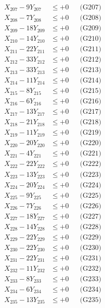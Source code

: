 \documentclass[a4paper,10pt]{article}
\begin{document}
{\begin{align}
X_{207} - 9Y_{207} &\leq +0 && \text{(G207)} \\
\allowbreak
X_{208} - 7Y_{208} &\leq +0 && \text{(G208)} \\
X_{209} - 18Y_{209} &\leq +0 && \text{(G209)} \\
X_{210} - 14Y_{210} &\leq +0 && \text{(G210)} \\
X_{211} - 22Y_{211} &\leq +0 && \text{(G211)} \\
X_{212} - 33Y_{212} &\leq +0 && \text{(G212)} \\
X_{213} - 33Y_{213} &\leq +0 && \text{(G213)} \\
X_{214} - 11Y_{214} &\leq +0 && \text{(G214)} \\
X_{215} - 8Y_{215} &\leq +0 && \text{(G215)} \\
X_{216} - 6Y_{216} &\leq +0 && \text{(G216)} \\
X_{217} - 13Y_{217} &\leq +0 && \text{(G217)} \\
\allowbreak
X_{218} - 21Y_{218} &\leq +0 && \text{(G218)} \\
X_{219} - 11Y_{219} &\leq +0 && \text{(G219)} \\
X_{220} - 20Y_{220} &\leq +0 && \text{(G220)} \\
X_{221} - 4Y_{221} &\leq +0 && \text{(G221)} \\
X_{222} - 22Y_{222} &\leq +0 && \text{(G222)} \\
X_{223} - 13Y_{223} &\leq +0 && \text{(G223)} \\
X_{224} - 20Y_{224} &\leq +0 && \text{(G224)} \\
X_{225} - 9Y_{225} &\leq +0 && \text{(G225)} \\
X_{226} - 7Y_{226} &\leq +0 && \text{(G226)} \\
X_{227} - 18Y_{227} &\leq +0 && \text{(G227)} \\
\allowbreak
X_{228} - 14Y_{228} &\leq +0 && \text{(G228)} \\
X_{229} - 22Y_{229} &\leq +0 && \text{(G229)} \\
X_{230} - 22Y_{230} &\leq +0 && \text{(G230)} \\
X_{231} - 22Y_{231} &\leq +0 && \text{(G231)} \\
X_{232} - 11Y_{232} &\leq +0 && \text{(G232)} \\
X_{233} - 8Y_{233} &\leq +0 && \text{(G233)} \\
X_{234} - 6Y_{234} &\leq +0 && \text{(G234)} \\
X_{235} - 13Y_{235} &\leq +0 && \text{(G235)} \\

\end{align}}
\end{document}
